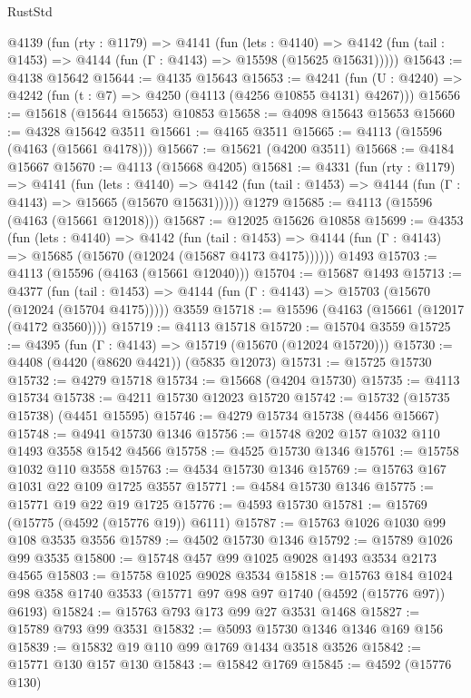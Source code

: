 \begin{lexlean}{RustStd}
\begin{coremodule}
  @4139
    (fun (rty : @1179) =>
    @4141
      (fun (lets : @4140) =>
      @4142 (fun (tail : @1453) => @4144 (fun (Γ : @4143) => @15598 (@15625 @15631)))))
@15643 := @4138 @15642
@15644 := @4135 @15643
@15653 := @4241
    (fun (U : @4240) => @4242 (fun (t : @7) => @4250 (@4113 (@4256 @10855 @4131) @4267)))
@15656 := @15618 (@15644 @15653) @10853
@15658 := @4098 @15643 @15653
@15660 := @4328 @15642 @3511
@15661 := @4165 @3511
@15665 := @4113 (@15596 (@4163 (@15661 @4178)))
@15667 := @15621 (@4200 @3511)
@15668 := @4184 @15667
@15670 := @4113 (@15668 @4205)
@15681 := @4331
    (fun (rty : @1179) =>
    @4141
      (fun (lets : @4140) =>
      @4142 (fun (tail : @1453) => @4144 (fun (Γ : @4143) => @15665 (@15670 @15631)))))
    @1279
@15685 := @4113 (@15596 (@4163 (@15661 @12018)))
@15687 := @12025 @15626 @10858
@15699 := @4353
    (fun (lets : @4140) =>
    @4142
      (fun (tail : @1453) =>
      @4144 (fun (Γ : @4143) => @15685 (@15670 (@12024 (@15687 @4173 @4175))))))
    @1493
@15703 := @4113 (@15596 (@4163 (@15661 @12040)))
@15704 := @15687 @1493
@15713 := @4377
    (fun (tail : @1453) => @4144 (fun (Γ : @4143) => @15703 (@15670 (@12024 (@15704 @4175)))))
    @3559
@15718 := @15596 (@4163 (@15661 (@12017 (@4172 @3560))))
@15719 := @4113 @15718
@15720 := @15704 @3559
@15725 := @4395 (fun (Γ : @4143) => @15719 (@15670 (@12024 @15720)))
@15730 := @4408 (@4420 (@8620 @4421)) (@5835 @12073)
@15731 := @15725 @15730
@15732 := @4279 @15718
@15734 := @15668 (@4204 @15730)
@15735 := @4113 @15734
@15738 := @4211 @15730 @12023 @15720
@15742 := @15732 (@15735 @15738) (@4451 @15595)
@15746 := @4279 @15734 @15738 (@4456 @15667)
@15748 := @4941 @15730 @1346
@15756 := @15748 @202 @157 @1032 @110 @1493 @3558 @1542 @4566
@15758 := @4525 @15730 @1346
@15761 := @15758 @1032 @110 @3558
@15763 := @4534 @15730 @1346
@15769 := @15763 @167 @1031 @22 @109 @1725 @3557
@15771 := @4584 @15730 @1346
@15775 := @15771 @19 @22 @19 @1725
@15776 := @4593 @15730
@15781 := @15769 (@15775 (@4592 (@15776 @19)) @6111)
@15787 := @15763 @1026 @1030 @99 @108 @3535 @3556
@15789 := @4502 @15730 @1346
@15792 := @15789 @1026 @99 @3535
@15800 := @15748 @457 @99 @1025 @9028 @1493 @3534 @2173 @4565
@15803 := @15758 @1025 @9028 @3534
@15818 := @15763
    @184
    @1024
    @98
    @358
    @1740
    @3533
    (@15771 @97 @98 @97 @1740 (@4592 (@15776 @97)) @6193)
@15824 := @15763 @793 @173 @99 @27 @3531 @1468
@15827 := @15789 @793 @99 @3531
@15832 := @5093 @15730 @1346 @1346 @169 @156
@15839 := @15832 @19 @110 @99 @1769 @1434 @3518 @3526
@15842 := @15771 @130 @157 @130
@15843 := @15842 @1769
@15845 := @4592 (@15776 @130)

\end{coremodule}
\end{lexlean}
